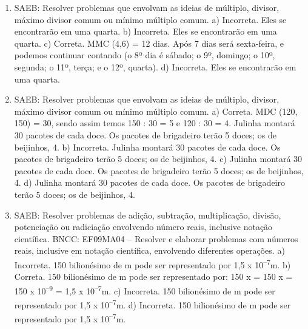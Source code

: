 \begin{enumerate}
\item
SAEB: Resolver problemas que envolvam as ideias de múltiplo, 
divisor, máximo divisor comum ou mínimo múltiplo comum.
a) Incorreta. Eles se encontrarão em uma quarta.
b) Incorreta. Eles se encontrarão em uma quarta.
c) Correta. MMC (4,6) = 12 dias. Após 7 dias será sexta-feira, e podemos 
continuar contando (o 8º dia é sábado; o 9º, domingo; o 10º, segunda;
o 11º, terça; e o 12º, quarta).
d) Incorreta. Eles se encontrarão em uma quarta.

\item
SAEB: Resolver problemas que envolvam as ideias de múltiplo, 
divisor, máximo divisor comum ou mínimo múltiplo comum.
a) Correta. MDC (120, 150) = 30, sendo assim temos 150 : 30 = 5 e 120 : 30 = 4. Julinha montará 30 pacotes de cada doce. Os pacotes de brigadeiro terão 5 doces; os de beijinhos, 4.
b) Incorreta. Julinha montará 30 pacotes de cada doce. Os pacotes de brigadeiro terão 5 doces; os de beijinhos, 4.
c) Julinha montará 30 pacotes de cada doce. Os pacotes de brigadeiro terão 5 doces; os de beijinhos, 4.
d) Julinha montará 30 pacotes de cada doce. Os pacotes de brigadeiro terão 5 doces; os de beijinhos, 4. 

\item
SAEB: Resolver problemas de adição, subtração, multiplicação, 
divisão, potenciação ou radiciação envolvendo número reais, inclusive
notação científica.
BNCC: EF09MA04 -- Resolver e elaborar problemas com números reais, 
inclusive em notação científica, envolvendo diferentes operações.
a) Incorreta. 150 bilionésimo de m pode ser representado por 1,5 x 10\textsuperscript{--7}m.
b) Correta. 150 bilionésimo de m pode ser representado por:
150 x  = 150 x  
= 150 x 10\textsuperscript{--9} = 1,5 x 10\textsuperscript{--7}m.
c) Incorreta. 150 bilionésimo de m pode ser representado por 1,5 x 10\textsuperscript{--7}m.
d) Incorreta. 150 bilionésimo de m pode ser representado por 1,5 x 10\textsuperscript{--7}m.
\end{enumerate}


